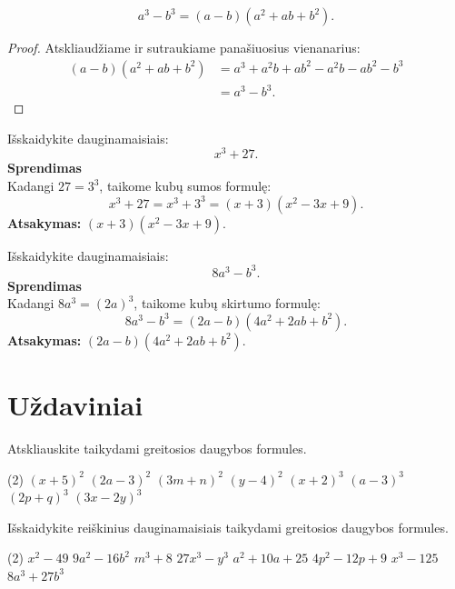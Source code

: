\documentclass[11pt,a4paper]{scrartcl}
\begin{document}
\begin{property}
\[
a^3-b^3=(a-b)(a^2+ab+b^2).
\]
\end{property}

\begin{proof}
Atskliaudžiame ir sutraukiame panašiuosius vienanarius:
\[
\begin{aligned}
(a-b)(a^2+ab+b^2)
&=a^3+a^2b+ab^2-a^2b-ab^2-b^3\\
&=a^3-b^3.
\end{aligned}
\]
\end{proof}

\begin{example}
Išskaidykite dauginamaisiais:
\[
x^3+27.
\]
\textbf{Sprendimas}\\
Kadangi $27=3^3$, taikome kubų sumos formulę:
\[
x^3+27=x^3+3^3=(x+3)(x^2-3x+9).
\]
\textbf{Atsakymas:} $(x+3)(x^2-3x+9)$.
\end{example}

\begin{example}
Išskaidykite dauginamaisiais:
\[
8a^3-b^3.
\]
\textbf{Sprendimas}\\
Kadangi $8a^3=(2a)^3$, taikome kubų skirtumo formulę:
\[
8a^3-b^3=(2a-b)(4a^2+2ab+b^2).
\]
\textbf{Atsakymas:} $(2a-b)(4a^2+2ab+b^2)$.
\end{example}

\section{Uždaviniai}

\begin{problem}
 Atskliauskite taikydami greitosios daugybos formules.
\begin{tasks}[label={(\arabic*)}, label-offset=0.9em](2)
	\task $(x+5)^2$
	\task $(2a-3)^2$
	\task $(3m+n)^2$
	\task $(y-4)^2$
	\task $(x+2)^3$
	\task $(a-3)^3$
	\task $(2p+q)^3$
	\task $(3x-2y)^3$
\end{tasks}
\end{problem}

\begin{problem}
Išskaidykite reiškinius dauginamaisiais taikydami greitosios daugybos formules.
\begin{tasks}[label={(\arabic*)}, label-offset=0.9em](2)
	\task $x^2-49$
	\task $9a^2-16b^2$
	\task $m^3+8$
	\task $27x^3-y^3$
	\task $a^2+10a+25$
	\task $4p^2-12p+9$
	\task $x^3-125$
	\task $8a^3+27b^3$
\end{tasks}
\end{problem}
\end{document}
